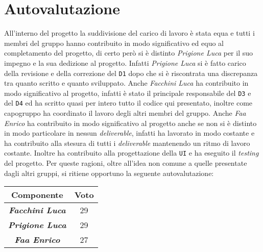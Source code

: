 \chapter{Autovalutazione}
All'interno del progetto la suddivisione del carico di lavoro è stata equa e tutti i membri del gruppo hanno contribuito in modo significativo ed equo al completamento del progetto, di certo però si è distinto \textit{Prigione Luca} per il suo impegno e la sua dedizione al progetto. Infatti \textit{Prigione Luca} si è fatto carico della revisione e della correzione del \texttt{D1} dopo che si è riscontrata una discrepanza tra quanto scritto e quanto sviluppato. Anche \textit{Facchini Luca} ha contribuito in modo significativo al progetto, infatti è stato il principale responsabile del \texttt{D3} e del \texttt{D4} ed ha scritto quasi per intero tutto il codice qui presentato, inoltre come capogruppo ha coordinato il lavoro degli altri membri del gruppo. Anche \textit{Faa Enrico} ha contribuito in modo significativo al progetto anche se non si è distinto in modo particolare in nessun \textit{deliverable}, infatti ha lavorato in modo costante e ha contribuito alla stesura di tutti i \textit{deliverable} mantenendo un ritmo di lavoro costante. Inoltre ha contribuito alla progettazione della \texttt{UI} e ha eseguito il \textit{testing} del progetto. \newline
Per queste ragioni, oltre all'idea non comune a quelle presentate dagli altri gruppi, si ritiene opportuno la seguente autovalutazione:
    \begin{table}[H]
        \centering
        \begin{tabular}{|c|c|}
            \hline
            \textbf{Componente} & \textbf{Voto} \\
            \hline
            \textbf{\textit{Facchini Luca}} & 29 \\
            \hline
            \textbf{\textit{Prigione Luca}} & 29 \\
            \hline
            \textbf{\textit{Faa Enrico}} & 27 \\
            \hline
        \end{tabular}
    \end{table}